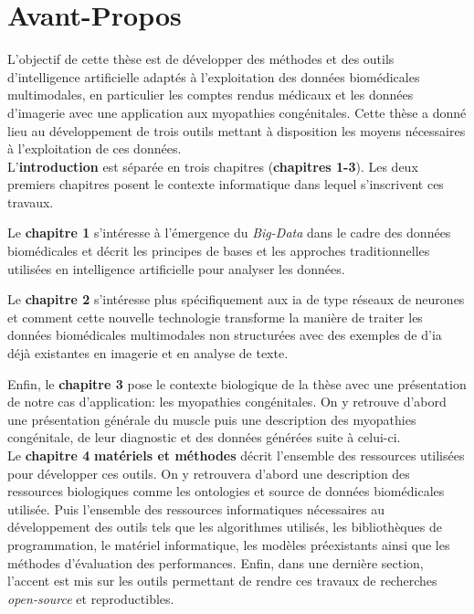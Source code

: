 \chapter{Avant-Propos}
L'objectif de cette thèse est de développer des méthodes et des outils d'intelligence artificielle adaptés à l'exploitation des données biomédicales multimodales, en particulier les comptes rendus médicaux et les données d'imagerie avec une application aux myopathies congénitales. Cette thèse a donné lieu au développement de trois outils mettant à disposition les moyens nécessaires à l'exploitation de ces données. \\


L'\textbf{introduction} est séparée en trois chapitres (\textbf{chapitres 1-3}). Les deux premiers chapitres posent le contexte informatique dans lequel s'inscrivent ces travaux. 

Le \textbf{chapitre 1} s'intéresse à l'émergence du \textit{Big-Data} dans le cadre des données biomédicales et décrit les principes de bases et les approches traditionnelles utilisées en intelligence artificielle pour analyser les données.

Le \textbf{chapitre 2} s'intéresse plus spécifiquement aux \gls{ia} de type réseaux de neurones et comment cette nouvelle technologie transforme la manière de traiter les données biomédicales multimodales non structurées avec des exemples de d'\gls{ia} déjà existantes en imagerie et en analyse de texte.

Enfin, le \textbf{chapitre 3} pose le contexte biologique de la thèse avec une présentation de notre cas d'application: les myopathies congénitales. On y retrouve d'abord une présentation générale du muscle puis une description des myopathies congénitale, de leur diagnostic et des données générées suite à celui-ci. \\


Le \textbf{chapitre 4} \textbf{matériels et méthodes} décrit l'ensemble des ressources utilisées pour développer ces outils. On y retrouvera d'abord une description des ressources biologiques comme les ontologies et source de données biomédicales utilisée. Puis l'ensemble des ressources informatiques nécessaires au développement des outils tels que les algorithmes utilisés, les bibliothèques de programmation, le matériel informatique, les modèles préexistants ainsi que les méthodes d'évaluation des performances. Enfin, dans une dernière section, l'accent est mis sur les outils permettant de rendre ces travaux de recherches \textit{open-source} et reproductibles. \\



